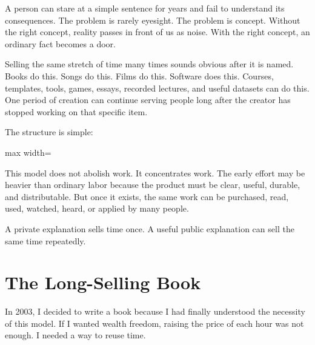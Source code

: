 A person can stare at a simple sentence for years and fail to understand its consequences. The problem is rarely eyesight. The problem is concept. Without the right concept, reality passes in front of us as noise. With the right concept, an ordinary fact becomes a door.

Selling the same stretch of time many times sounds obvious after it is named. Books do this. Songs do this. Films do this. Software does this. Courses, templates, tools, games, essays, recorded lectures, and useful datasets can do this. One period of creation can continue serving people long after the creator has stopped working on that specific item.

The structure is simple:

\begin{center}
\begin{adjustbox}{max width=\linewidth}
\end{adjustbox}
\end{center}

This model does not abolish work. It concentrates work. The early effort may be heavier than ordinary labor because the product must be clear, useful, durable, and distributable. But once it exists, the same work can be purchased, read, used, watched, heard, or applied by many people.

A private explanation sells time once. A useful public explanation can sell the same time repeatedly.

\section*{The Long-Selling Book}

In 2003, I decided to write a book because I had finally understood the necessity of this model. If I wanted wealth freedom, raising the price of each hour was not enough. I needed a way to reuse time.

